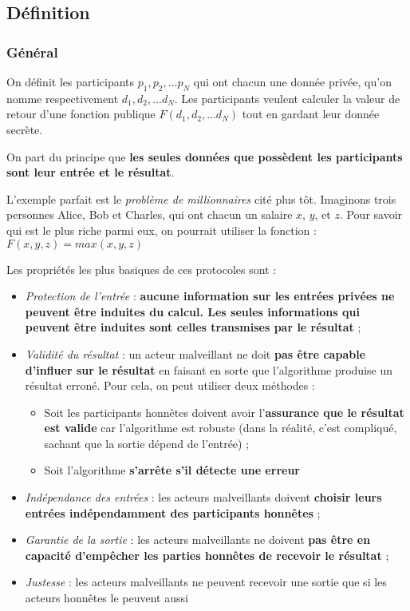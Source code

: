 \documentclass[12pt,a4paper]{article}
\begin{document}
\subsection{Définition}
\subsubsection{Général}
On définit les participants \(p_1, p_2, …p_N\) qui ont chacun une donnée privée, qu’on nomme respectivement \(d_1, d_2, …d_N\). Les participants veulent calculer la valeur de retour d’une fonction publique \(F(d_1, d_2, …d_N)\) tout en gardant leur donnée secrète.

On part du principe que \textbf{les seules données que possèdent les participants sont leur entrée et le résultat}.

L’exemple parfait est le \textit{problème de millionnaires} cité plus tôt. Imaginons trois personnes Alice, Bob et Charles, qui ont chacun un salaire $x$, $y$, et $z$. Pour savoir qui est le plus riche parmi eux, on pourrait utiliser la fonction : $F(x, y, z) = max(x, y, z)$

Les propriétés les plus basiques de ces protocoles sont :
\begin{itemize}
    \item \textit{Protection de l’entrée} : \textbf{aucune information sur les entrées privées ne peuvent être induites du calcul. Les seules informations qui peuvent être induites sont celles transmises par le résultat} ;
    \item \textit{Validité du résultat} : un acteur malveillant ne doit \textbf{pas être capable d’influer sur le résultat} en faisant en sorte que l’algorithme produise un résultat erroné. Pour cela, on peut utiliser deux méthodes :
    \begin{itemize}[label=$\star$]
        \item Soit les participants honnêtes doivent avoir l’\textbf{assurance que le résultat est valide} car l’algorithme est robuste (dans la réalité, c’est compliqué, sachant que la sortie dépend de l’entrée) ;
        \item Soit l’algorithme \textbf{s'arrête s’il détecte une erreur}
    \end{itemize}
    \item \textit{Indépendance des entrées} : les acteurs malveillants doivent \textbf{choisir leurs entrées indépendamment des participants honnêtes} ;
    \item \textit{Garantie de la sortie} : les acteurs malveillants ne doivent \textbf{pas être en capacité d’empêcher les parties honnêtes de recevoir le résultat} ;
    \item \textit{Justesse} : les acteurs malveillants ne peuvent recevoir une sortie que si les acteurs honnêtes le peuvent aussi
\end{itemize}
\end{document}
